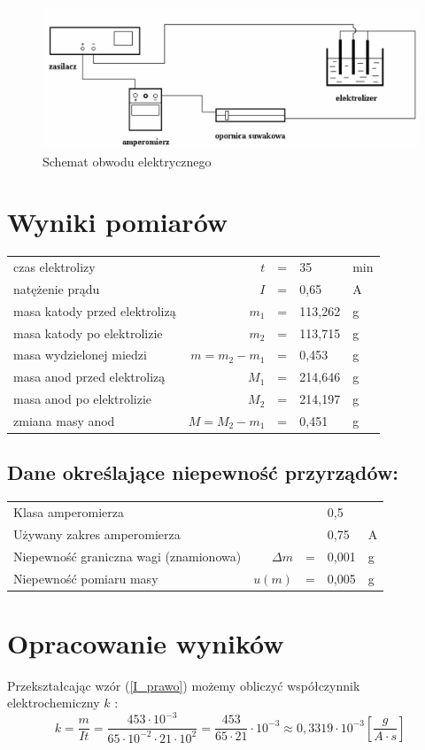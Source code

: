 \documentclass [a4paper,11pt]{article}
\begin{document}
\begin{figure}[h!]
\centering
\includegraphics[width=0.7\linewidth]{./uklad}
\caption{Schemat obwodu elektrycznego}
\label{fig:uklad}
\end{figure}


\section{Wyniki pomiarów}
\begin{tabular}{lrlll}
czas elektrolizy               & $t$ & = & 35 & min  \\ 
 natężenie prądu               &  $I$ & = & 0,65 & A \\ 
 masa katody przed elektrolizą &  $m_1$ & = & 113,262 & g \\ 
  masa katody po elektrolizie  &   $m_2$ & = & 113,715 & g\\ 
 masa wydzielonej miedzi       &  $m = m_2 - m_1$& = & 0,453 & g \\ 
 masa anod przed elektrolizą   &   $M_1$ & = &214,646 & g\\ 
 masa anod po elektrolizie     &   $M_2$ & = &214,197 & g\\ 
zmiana masy anod               &  $M = M_2 - m_1$& = & 0,451 & g \\  
\end{tabular} 

\subsection*{Dane określające niepewność przyrządów:}
\begin{tabular}{lrlll}
Klasa amperomierza              & &  & 0,5 &   \\ 
Używany zakres amperomierza               &   &  & 0,75 & A \\ 
Niepewność graniczna wagi (znamionowa)&  $\Delta m$ & = & 0,001 & g \\ 
 Niepewność pomiaru masy &   $u(m)$& = & 0,005 & g\\  
\end{tabular} 

\section{Opracowanie wyników}
Przekształcając wzór (\ref{I_prawo}) możemy obliczyć współczynnik elektrochemiczny $k$ :
\begin{equation}
k = \frac{m}{I t} = \frac{453 \cdot 10^{-3}}{65 \cdot 10^{-2} \cdot 21 \cdot 10^2} = \frac{453}{65 \cdot 21} \cdot 10^{-3} \approx 0,3319 \cdot 10^{-3} \left[  \frac{g}{A \cdot s}\right] 
\label{k_obliczone} 
\end{equation}
\end{document}
